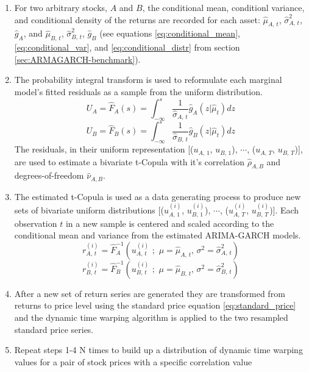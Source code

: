 \documentclass[12pt]{article}
\begin{document}
\begin{enumerate}
    \item For two arbitrary stocks, $A$ and $B$, the conditional mean, conditionl variance, and conditional density of the returns are recorded for each asset: $\hat{\mu}_{A,\,t}$, $\hat{\sigma}^{2}_{A,\,t}$, $\hat{g}_{A}$, and $\hat{\mu}_{B,\,t}$, $\hat{\sigma}^{2}_{B,\,t}$, $\hat{g}_{B}$ (see equations \ref{eq:conditional_mean}, \ref{eq:conditional_var}, and \ref{eq:conditional_distr} from section \ref{sec:ARMAGARCH-benchmark}).
    \item The probability integral transform is used to reformulate each marginal model's fitted residuals as a sample from the uniform distribution.
    \begin{equation} \nonumber
        U_{A} = \hat{F}_{A}(s) = \int_{-\infty}^{s} \frac{1}{\hat{\sigma}_{A,\,t}} \hat{g}_{A} \left(z | \hat{\mu}_{t}\right) dz
    \end{equation}
    \begin{equation} \nonumber
        U_{B} = \hat{F}_{B}(s) = \int_{-\infty}^{s} \frac{1}{\hat{\sigma}_{B,\,t}} \hat{g}_{B} \left(z | \hat{\mu}_{t}\right) dz
    \end{equation}
    The residuals, in their uniform representation [($u_{A,\,1}$, $u_{B,\,1}$), $\cdots$, ($u_{A,\,T}$, $u_{B,\,T}$)], are used to estimate a bivariate t-Copula with it's correlation $\hat{\rho}_{A,B}$ and degrees-of-freedom $\hat{\nu}_{A,B}$.
    \item The estimated t-Copula is used as a data generating process to produce new sets of bivariate uniform distributions [($u^{(i)}_{A,\,1}$, $u^{(i)}_{B,\,1}$), $\cdots$, ($u^{(i)}_{A,\,T}$, $u^{(i)}_{B,\,T}$)]. Each observation $t$ in a new sample is centered and scaled according to the conditional mean and variance from the estimated ARIMA-GARCH models.
    \begin{equation} \nonumber
        r^{(i)}_{A,\,t} = \hat{F}^{-1}_{A} \left(u^{(i)}_{A,\,t}\,\,;\,\, \mu=\hat{\mu}_{A,\,t},\, \sigma^{2}=\hat{\sigma}^{2}_{A,\,t} \right)
    \end{equation}
    \begin{equation} \nonumber
        r^{(i)}_{B,\,t} = \hat{F}^{-1}_{B} \left(u^{(i)}_{B,\,t}\,\,;\,\, \mu=\hat{\mu}_{B,\,t},\, \sigma^{2}=\hat{\sigma}^{2}_{B,\,t} \right)
    \end{equation}
    \item After a new set of return series are generated they are transformed from returns to price level using the standard price equation \ref{eq:standard_price} and the dynamic time warping algorithm is applied to the two resampled standard price series.
    \item Repeat steps 1-4 N times to build up a distribution of dynamic time warping values for a pair of stock prices with a specific correlation value
\end{enumerate}
\end{document}
